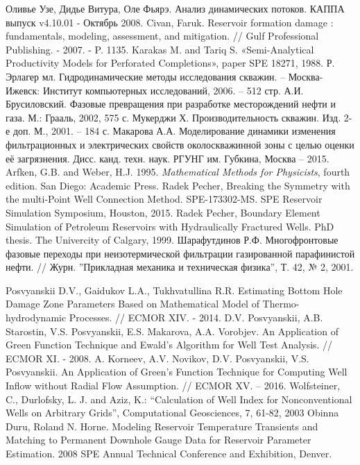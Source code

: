 \begin{thebibliography}{99}
 Оливье Узе, Дидье Витура, Оле Фьярэ. Анализ динамических потоков. КАППА выпуск v4.10.01 - Октябрь 2008.
 Civan, Faruk. Reservoir formation damage : fundamentals, modeling, assessment, and mitigation. // Gulf Professional Publishing. - 2007. - P. 1135.
 Karakas M. and Tariq S. «Semi-Analytical Productivity Models for Perforated Completions», paper SPE 18271, 1988.
 Р. Эрлагер мл. Гидродинамические методы исследования скважин. -- Москва-Ижевск: Институт компьютерных исследований, 2006. -- 512 стр.
 А.И. Брусиловский. Фазовые превращения при разработке месторождений нефти и газа. М.: Грааль, 2002, 575 с.
 Мукерджи Х. Производительность скважин. Изд. 2-е доп. М., 2001. -- 184 с.
 Макарова А.А. Моделирование динамики изменения фильтрационных и электрических свойств околоскважинной зоны с целью оценки её загрязнения. Дисс. канд. техн. наук. РГУНГ им. Губкина, Москва -- 2015.
 Arfken, G.B. and Weber, H.J. 1995. \textit{Mathematical Methods for Physicists}, fourth edition. San Diego: Academic Press.
 Radek Pecher, Breaking the Symmetry with the multi-Point Well Connection Method. SPE-173302-MS. SPE Reservoir Simulation Symposium, Houston, 2015.
 Radek Pecher, Boundary Element Simulation of Petroleum Reservoirs with Hydraulically Fractured Wells. PhD thesis. The Univercity of Calgary, 1999.
 Шарафутдинов Р.Ф. Многофронтовые фазовые переходы при неизотермической фильтрации газированной парафинистой нефти. // Журн. ''Прикладная механика и техническая физика'', Т. 42, № 2, 2001.

 Posvyanskii D.V., Gaidukov L.A., Tukhvatullina R.R. Estimating Bottom Hole Damage Zone Parameters Based on Mathematical Model of Thermo-hydrodynamic Processes. // ECMOR XIV. - 2014.
 D.V. Posvyanskii, A.B. Starostin, V.S. Posvyanskii, E.S. Makarova, A.A. Vorobjev. An Application of Green Function Technique and Ewald's Algorithm for Well Test Analysis. // ECMOR XI. - 2008.
A. Korneev, A.V. Novikov, D.V. Posvyanskii, V.S. Posvyanskii. An Application of Green's Function Technique for Computing Well Inflow without Radial Flow Assumption. // ECMOR XV. -- 2016.
 Wolfsteiner, C., Durlofsky, L. J. and Aziz, K.: “Calculation of Well Index for Nonconventional Wells on Arbitrary Grids”, Computational Geosciences, 7, 61-82, 2003
 Obinna Duru, Roland N. Horne. Modeling Reservoir Temperature Transients and Matching to Permanent Downhole Gauge Data for Reservoir Parameter Estimation. 2008 SPE Annual Technical Conference and Exhibition, Denver.

\end{thebibliography}
	
